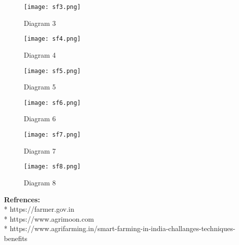 \documentclass[12pt]{article}
\begin{document}
\begin{figure}
	\centering
	\texttt{[image: sf3.png]}
	\caption{ Diagram 3} 
	
	\texttt{[image: sf4.png]}
	\caption{ Diagram 4} 
	
	\label{image_3} %
	\label{image_4} %
	
\end{figure}

\begin{figure}
	\centering
	\texttt{[image: sf5.png]}
	\caption{ Diagram 5} 
	
	\texttt{[image: sf6.png]}
	\caption{ Diagram 6} 
	\label{image_5} %
	\label{image_6} %
\end{figure}

\begin{figure}
	\centering
	\texttt{[image: sf7.png]}
	\caption{ Diagram 7} 
	
	\texttt{[image: sf8.png]}
	\caption{ Diagram 8} 
	\label{image_7} %
	\label{image_8} %
\end{figure}



\textbf{Refrences:}\\*
https://farmer.gov.in \\*
https://www.agrimoon.com \\*
https://www.agrifarming.in/smart-farming-in-india-challanges-techniques-benefits
\end{document}
